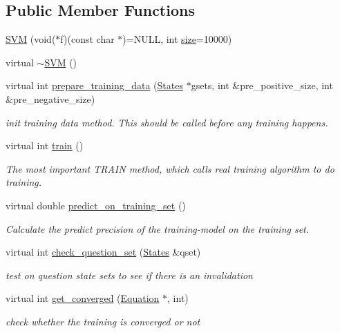 \subsection*{Public Member Functions}
\begin{DoxyCompactItemize}
\item 
\hyperlink{classSVM_ad8716b6d07bd35810f62662856af3a09}{S\+VM} (void($\ast$f)(const char $\ast$)=N\+U\+LL, int \hyperlink{classSVM_a4563cef982f6e1c67acf0c7b0ec8909b}{size}=10000)
\item 
virtual \hyperlink{classSVM_ad2a87ef0f940145f04150e9561f10478}{$\sim$\+S\+VM} ()
\item 
virtual int \hyperlink{classSVM_a930fe217e3affd64acb6700f5f8082e1}{prepare\+\_\+training\+\_\+data} (\hyperlink{classStates}{States} $\ast$gsets, int \&pre\+\_\+positive\+\_\+size, int \&pre\+\_\+negative\+\_\+size)
\begin{DoxyCompactList}\small\item\em init training data method. This should be called before any training happens. \end{DoxyCompactList}\item 
virtual int \hyperlink{classSVM_a6a1d895b86522eab683d66ded4d3a049}{train} ()
\begin{DoxyCompactList}\small\item\em The most important T\+R\+A\+IN method, which calls real training algorithm to do training. \end{DoxyCompactList}\item 
virtual double \hyperlink{classSVM_af208fc653a382591f20c0fcf7a186362}{predict\+\_\+on\+\_\+training\+\_\+set} ()
\begin{DoxyCompactList}\small\item\em Calculate the predict precision of the training-\/model on the training set. \end{DoxyCompactList}\item 
virtual int \hyperlink{classSVM_aa610ec08173c8603ad6e02f26cbe8e1c}{check\+\_\+question\+\_\+set} (\hyperlink{classStates}{States} \&qset)
\begin{DoxyCompactList}\small\item\em test on question state sets to see if there is an invalidation \end{DoxyCompactList}\item 
virtual int \hyperlink{classSVM_a712dcd7cb65a8045a77dd474869dd5c4}{get\+\_\+converged} (\hyperlink{classEquation}{Equation} $\ast$, int)
\begin{DoxyCompactList}\small\item\em check whether the training is converged or not \end{DoxyCompactList}\item 

\end{DoxyCompactItemize}
